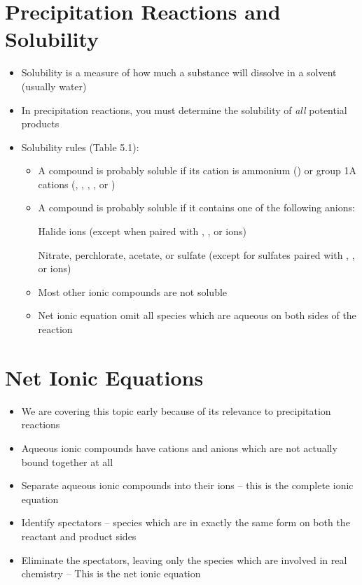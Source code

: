 \documentclass[12pt, openany, letterpaper]{memoir}
\begin{document}
\section{Precipitation Reactions and Solubility}
\begin{itemize}
	\item Solubility is a measure of how much a substance will dissolve in a solvent (usually water)
	\item In precipitation reactions, you must determine the solubility of \emph{all} potential products
	\item Solubility rules (Table 5.1):
	      \begin{itemize}
		      \item A compound is probably soluble if its cation is ammonium () or group 1A cations (, , , , or )
		      \item A compound is probably soluble if it contains one of the following anions:

		            Halide ions (except when paired with , , or  ions)

		            Nitrate, perchlorate, acetate, or sulfate (except for sulfates paired with , , or  ions)
		      \item Most other ionic compounds are not soluble
		      \item Net ionic equation omit all species which are aqueous on both sides of the reaction
	      \end{itemize}
\end{itemize}

\section*{Net Ionic Equations}
\begin{itemize}
	\item We are covering this topic early because of its relevance to precipitation reactions
	\item Aqueous ionic compounds have cations and anions which are not actually bound together at all
	\item Separate aqueous ionic compounds into their ions -- this is the complete ionic equation
	\item Identify spectators -- species which are in exactly the same form on both the reactant and product sides
	\item Eliminate the spectators, leaving only the species which are involved in real chemistry -- This is the net ionic equation
\end{itemize}
\end{document}
